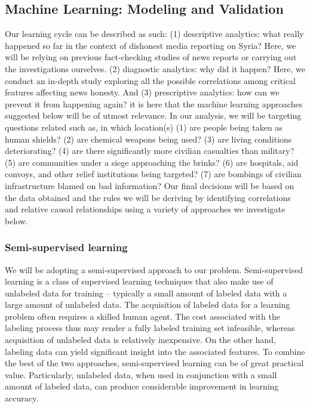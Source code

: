 \subsection{Machine Learning: Modeling and Validation} 

Our learning cycle can be described as such: (1) descriptive analytics: what really happened so far in the context of dishonest media reporting on Syria? Here, we will be relying on previous fact-checking studies of news reports or carrying out the investigations ourselves. (2) diagnostic analytics: why did it happen? Here, we conduct an in-depth study exploring all the possible correlations among critical features affecting news honesty. And (3) prescriptive analytics: how can we prevent it from happening again? it is here that the machine learning approaches suggested below will be of utmost relevance. In our analysis, we will be targeting questions related such as, in which location(s) (1) are people being taken as human shields? (2) are chemical weapons being used? (3) are living conditions deteriorating? (4) are there significantly more civilian casualties than military? (5) are communities under a siege approaching the brinks? (6) are hospitals, aid convoys, and other relief institutions being targeted? (7) are bombings of civilian infrastructure blamed on bad information? Our final decisions will be based on the data obtained and the rules we will be deriving by identifying correlations and relative causal relationships using a variety of approaches we investigate below. 

\subsubsection{Semi-supervised learning}

We will be adopting a semi-supervised approach to our problem. Semi-supervised learning is a class of supervised learning techniques that also make use of unlabeled data for training -- typically a small amount of labeled data with a large amount of unlabeled data. The acquisition of labeled data for a learning problem often requires a skilled human agent. The cost associated with the labeling process thus may render a fully labeled training set infeasible, whereas acquisition of unlabeled data is relatively inexpensive. On the other hand, labeling data can yield significant insight into the associated features. To combine the best of the two approaches, semi-supervised learning can be of great practical value. Particularly, unlabeled data, when used in conjunction with a small amount of labeled data, can produce considerable improvement in learning accuracy. 
 
